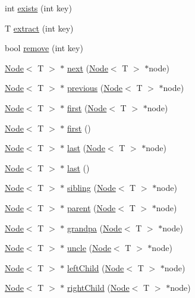 \begin{DoxyCompactItemize}
\item 
int \hyperlink{class_r_b_tree_a9a006660b7780a180fc87f2f8c89d1c9}{exists} (int key)
\item 
T \hyperlink{class_r_b_tree_ac21009120411c393b499893d6874370c}{extract} (int key)
\item 
bool \hyperlink{class_r_b_tree_a9a20aef5e8862b34bccc3d1f1c47a321}{remove} (int key)
\item 
\hyperlink{class_node}{Node}$<$ T $>$ $\ast$ \hyperlink{class_r_b_tree_a5c8cbef68755a4029cc2af88fd7f5d9f}{next} (\hyperlink{class_node}{Node}$<$ T $>$ $\ast$node)
\item 
\hyperlink{class_node}{Node}$<$ T $>$ $\ast$ \hyperlink{class_r_b_tree_ac7a8ea33e99ba8dfcc8379a18e44da7f}{previous} (\hyperlink{class_node}{Node}$<$ T $>$ $\ast$node)
\item 
\hyperlink{class_node}{Node}$<$ T $>$ $\ast$ \hyperlink{class_r_b_tree_a920561ef98e659233f743817a4780946}{first} (\hyperlink{class_node}{Node}$<$ T $>$ $\ast$node)
\item 
\hyperlink{class_node}{Node}$<$ T $>$ $\ast$ \hyperlink{class_r_b_tree_a69b25e832b54c369c3d4bb84bad9bf71}{first} ()
\item 
\hyperlink{class_node}{Node}$<$ T $>$ $\ast$ \hyperlink{class_r_b_tree_ad559890dcf3ef921173e63da2fdb0a22}{last} (\hyperlink{class_node}{Node}$<$ T $>$ $\ast$node)
\item 
\hyperlink{class_node}{Node}$<$ T $>$ $\ast$ \hyperlink{class_r_b_tree_ab381a71f2306578d907f31b408da0761}{last} ()
\item 
\hyperlink{class_node}{Node}$<$ T $>$ $\ast$ \hyperlink{class_r_b_tree_a6385e8c4d17abbd7050e53776075c26b}{sibling} (\hyperlink{class_node}{Node}$<$ T $>$ $\ast$node)
\item 
\hyperlink{class_node}{Node}$<$ T $>$ $\ast$ \hyperlink{class_r_b_tree_aabfe3497ee633a9864ec84fdb153c67d}{parent} (\hyperlink{class_node}{Node}$<$ T $>$ $\ast$node)
\item 
\hyperlink{class_node}{Node}$<$ T $>$ $\ast$ \hyperlink{class_r_b_tree_a9c1ef0de31b6bf2617a458a0e9d0bcef}{grandpa} (\hyperlink{class_node}{Node}$<$ T $>$ $\ast$node)
\item 
\hyperlink{class_node}{Node}$<$ T $>$ $\ast$ \hyperlink{class_r_b_tree_af60f8017b52f69173e0af61c8e581b48}{uncle} (\hyperlink{class_node}{Node}$<$ T $>$ $\ast$node)
\item 
\hyperlink{class_node}{Node}$<$ T $>$ $\ast$ \hyperlink{class_r_b_tree_a0ebb4015ec0066a0740dada8c7083921}{left\+Child} (\hyperlink{class_node}{Node}$<$ T $>$ $\ast$node)
\item 
\hyperlink{class_node}{Node}$<$ T $>$ $\ast$ \hyperlink{class_r_b_tree_a4eaf984e390a78e804564ad571e675ce}{right\+Child} (\hyperlink{class_node}{Node}$<$ T $>$ $\ast$node)
\end{DoxyCompactItemize}


